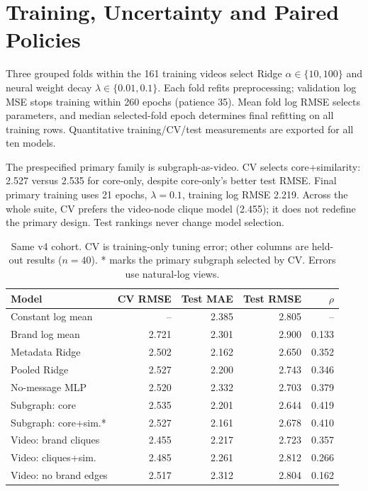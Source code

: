 \documentclass[a4paper,conference]{IEEEtran}
\begin{document}
\section{Training, Uncertainty and Paired Policies}
Three grouped folds within the 161 training videos select Ridge $\alpha\in\{10,100\}$ and neural weight decay $\lambda\in\{0.01,0.1\}$. Each fold refits preprocessing; validation log MSE stops training within 260 epochs (patience 35). Mean fold log RMSE selects parameters, and median selected-fold epoch determines final refitting on all training rows. Quantitative training/CV/test measurements are exported for all ten models.

The prespecified primary family is subgraph-as-video. CV selects core+similarity: 2.527 versus 2.535 for core-only, despite core-only's better test RMSE. Final primary training uses 21 epochs, $\lambda=0.1$, training log RMSE 2.219. Across the whole suite, CV prefers the video-node clique model (2.455); it does not redefine the primary design. Test rankings never change model selection.

\begin{table}[t]\caption{Same v4 cohort. CV is training-only tuning error; other columns are held-out results ($n=40$). * marks the primary subgraph selected by CV. Errors use natural-log views.}\label{tab:main}\centering\scriptsize\setlength{\tabcolsep}{3pt}
\begin{tabular}{lrrrr}\toprule
Model & CV RMSE & Test MAE & Test RMSE & $\rho$\\\midrule
Constant log mean & -- & 2.385 & 2.805 & -- \\
Brand log mean & 2.721 & 2.301 & 2.900 & 0.133 \\
Metadata Ridge & 2.502 & 2.162 & 2.650 & 0.352 \\
Pooled Ridge & 2.527 & 2.200 & 2.743 & 0.346 \\
No-message MLP & 2.520 & 2.332 & 2.703 & 0.379 \\
Subgraph: core & 2.535 & 2.201 & 2.644 & 0.419 \\
Subgraph: core+sim.* & 2.527 & 2.161 & 2.678 & 0.410 \\
Video: brand cliques & 2.455 & 2.217 & 2.723 & 0.357 \\
Video: cliques+sim. & 2.485 & 2.261 & 2.812 & 0.266 \\
Video: no brand edges & 2.517 & 2.312 & 2.804 & 0.162 \\
\bottomrule\end{tabular}\end{table}
\end{document}
